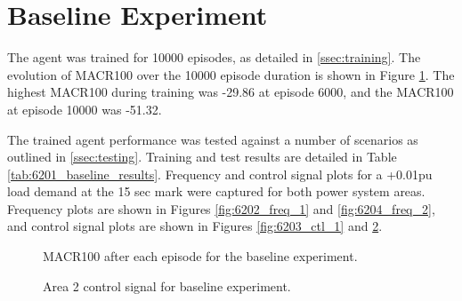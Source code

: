\section{Baseline Experiment}
The agent was trained for 10000 episodes, as detailed in \textsection \ref{ssec:training}. The evolution of MACR100 over the 10000 episode duration is shown in Figure \ref{fig:6201_average_reward}. The highest MACR100 during training was -29.86 at episode 6000, and the MACR100 at episode 10000 was -51.32.

The trained agent performance was tested against a number of scenarios as outlined in \textsection \ref{ssec:testing}. Training and test results are detailed in Table \ref{tab:6201_baseline_results}. Frequency and control signal plots for a +0.01pu load demand at the 15 sec mark were captured for both power system areas. Frequency plots are shown in Figures \ref{fig:6202_freq_1} and \ref{fig:6204_freq_2}, and control signal plots are shown in Figures \ref{fig:6203_ctl_1} and \ref{fig:6205_ctl_2}.

\begin{figure}[h]
	\centering
	
	\caption{MACR100 after each episode for the baseline experiment.}
	\label{fig:6201_average_reward}
\end{figure}





\begin{figure}[h]
	\centering
	
	\vspace{-0.5cm}
	\caption[Experiment 1 Area 1 frequency]{Area 1 frequency response for baseline experiment.}\label{fig:6202_freq_1}
	
	\vspace{0.5cm}
	
	
	\vspace{-0.5cm}
	\caption[Experiment 1 Area 1 control signal]{Area 1 control signal for baseline experiment.}\label{fig:6203_ctl_1}
	
	\vspace{0.5cm}
	
	
	\vspace{-0.5cm}
	\caption[Experiment 1 Area 2 frequency]{Area 2 frequency response for baseline experiment.}\label{fig:6204_freq_2}
	
	\vspace{0.5cm}
		
	
	\vspace{-0.5cm}
	\caption[Experiment 1 Area 2 control signal]{Area 2 control signal for baseline experiment.}\label{fig:6205_ctl_2}
\end{figure}